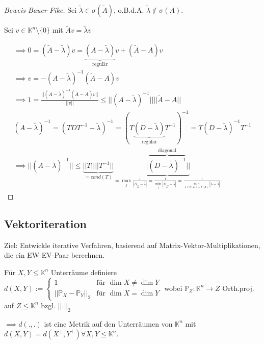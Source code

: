 \begin{proof}[Beweis Bauer-Fike]
	Sei $\tilde{\lambda} \in \sigma(\tilde{A})$, o.B.d.A. $\tilde{\lambda} \notin \sigma(A)$.
	
	Sei $v \in \mathbb{K}^n\setminus\{0\}$ mit $\tilde{A}v = \tilde{\lambda}v$
	
	\begin{align*}
		\implies 0 = (\tilde{A} - \tilde{\lambda})v = \underbrace{(A - \tilde{\lambda})}_{\text{regulär}}v + (\tilde{A} - A)v\\
		\implies v = -(A - \tilde{\lambda})^{-1}(\tilde{A} - A)v\\
		\implies 1 = \frac{||(A - \tilde{\lambda})^{-1}(\tilde{A} - A)v||}{||v||} \leq ||(A-\tilde{\lambda})^{-1}|| ||\tilde{A} - A||\\
		(A - \tilde{\lambda})^{-1} = (TDT^{-1} - \tilde{\lambda})^{-1} = (T \underbrace{(D-\tilde{\lambda})}_{\text{regulär}}T^{-1})^{-1} = T(D - \tilde{\lambda})^{-1}T^{-1}\\
		\implies ||(A - \tilde{\lambda})^{-1}|| \leq \underbrace{||T|| ||T^{-1}||}_{=cond(T)} \underbrace{||\overbrace{(D-\tilde{\lambda})^{-1}}^{\text{diagonal}}||}_{=\max_j \frac{1}{|D_{jj} - \tilde{\lambda}|} = \frac{1}{\min_j |D_{jj} - \tilde{\lambda}|} = \frac{1}{\min_{\lambda \in \sigma(D) = \sigma(A)}|\lambda - \tilde{\lambda}|}}
	\end{align*}
\end{proof}

\subsection{Vektoriteration}

Ziel: Entwickle iterative Verfahren, basierend auf Matrix-Vektor-Multiplikationen, die ein EW-EV-Paar berechnen.

\begin{lemma}
	Für $X,Y \leq \mathbb{K}^n$ Unterräume definiere $d(X,Y) := \begin{cases}
		1 & \text{für } \dim X \neq \dim Y\\
		|| \mathbb{P}_X - \mathbb{P}_Y ||_2 & \text{für } \dim X = \dim Y
	\end{cases}$ wobei $\mathbb{P}_Z: \mathbb{K}^n \rightarrow Z$ Orth.proj. auf $Z \leq \mathbb{K}^n$ bzgl. $||.||_2$
	
	$\implies d(., .)$ ist eine Metrik auf den Unterräumen von $\mathbb{K}^n$ mit $d(X,Y) = d(X^\perp, Y^\perp) \forall X,Y \leq \mathbb{K}^n$.
\end{lemma}

